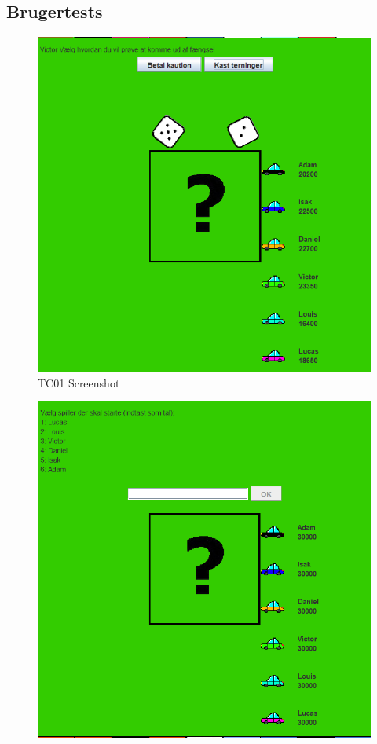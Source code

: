 \begin{flushleft}
\subsection{Brugertests}
\begin{figure}[H] %
    \centering
    \includegraphics[width=16cm]{Report/figures/Usertests/BilagTC01.png}
    \caption{TC01 Screenshot}
    \label{TC01Bilag}
\end{figure}\begin{figure}[H] %
    \centering
    \includegraphics[width=16cm]{Report/figures/Usertests/BilagTC02.png}

\end{figure}
\end{flushleft}
